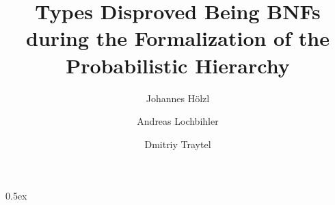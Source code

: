 \documentclass[11pt,a4paper]{article}
\begin{document}
\title{Types Disproved Being BNFs during the Formalization of the Probabilistic Hierarchy}
\author{Johannes H\"olzl \and Andreas Lochbihler \and Dmitriy Traytel}
\maketitle

\tableofcontents

\parindent 0pt\parskip 0.5ex




%
%
\end{document}
